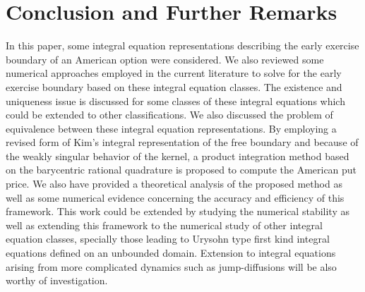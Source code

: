 \documentclass[fleqn,final,3p,11pt]{elsarticle}
\theoremstyle{definition}
\theoremstyle{remark}
\numberwithin{equation}{section}
\begin{document}
\section{Conclusion and Further Remarks}\label{conclusion}
In this paper, some integral equation representations describing the early exercise boundary of an American option were considered. We also reviewed some numerical approaches employed in the current literature to solve for the early exercise boundary based on these integral equation classes. 
The existence and uniqueness issue is discussed for some classes of these integral equations which could be extended to other classifications. We also discussed the problem of equivalence between these integral equation representations. By employing a revised form of Kim's integral representation of the free boundary and because of the weakly singular behavior of the kernel, a product integration method based on the barycentric rational 
quadrature is proposed to compute the American put price. We also have provided a theoretical analysis of the proposed method as well as some 
numerical evidence concerning the accuracy and efficiency of this framework. This work could be extended by studying the numerical stability as well as extending this framework to the numerical study of other integral equation classes, specially those leading to Urysohn type first kind integral equations defined on an unbounded domain. Extension to integral equations arising from more complicated dynamics such as jump-diffusions will be also worthy of investigation.
\end{document}
